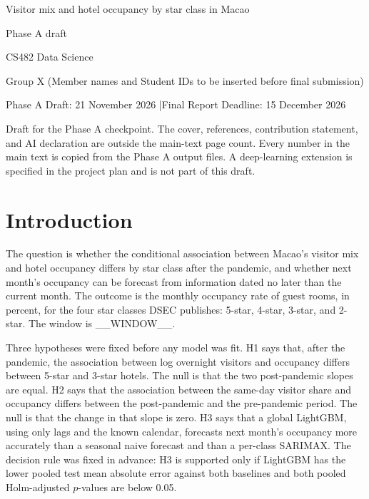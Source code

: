 \documentclass[11pt,a4paper]{article}
\begin{document}
\begin{titlepage}
\centering
\vspace*{22mm}
{\Large Visitor mix and hotel occupancy by star class in Macao\par}
\vspace{0.8em}
{\large Phase A draft\par}
\vspace{0.8em}
CS482 Data Science\par
Group X (Member names and Student IDs to be inserted before final submission)\par
\vspace{0.6em}
Phase A Draft: 21 November 2026 \quad|\quad Final Report Deadline: 15 December 2026\par
\vspace{1.6em}
\begin{minipage}{\textwidth}
\raggedright
Draft for the Phase A checkpoint. The cover, references, contribution statement, and AI declaration are outside the main-text page count. Every number in the main text is copied from the Phase A output files. A deep-learning extension is specified in the project plan and is not part of this draft.
\end{minipage}
\end{titlepage}

\section{Introduction}
The question is whether the conditional association between Macao's visitor mix and hotel occupancy differs by star class after the pandemic, and whether next month's occupancy can be forecast from information dated no later than the current month. The outcome is the monthly occupancy rate of guest rooms, in percent, for the four star classes DSEC publishes: 5-star, 4-star, 3-star, and 2-star. The window is __WINDOW__.

Three hypotheses were fixed before any model was fit. H1 says that, after the pandemic, the association between log overnight visitors and occupancy differs between 5-star and 3-star hotels. The null is that the two post-pandemic slopes are equal. H2 says that the association between the same-day visitor share and occupancy differs between the post-pandemic and the pre-pandemic period. The null is that the change in that slope is zero. H3 says that a global LightGBM, using only lags and the known calendar, forecasts next month's occupancy more accurately than a seasonal naive forecast and than a per-class SARIMAX. The decision rule was fixed in advance: H3 is supported only if LightGBM has the lower pooled test mean absolute error against both baselines and both pooled Holm-adjusted \(p\)-values are below 0.05.
\end{document}
